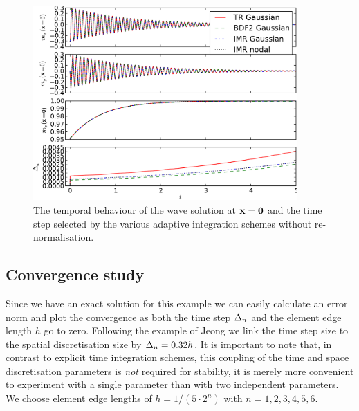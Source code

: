 \begin{figure}
  \centering
  \includegraphics[width=0.9\textwidth]{plots/2d_wave_solution_time_trace/get2oftracevaluesvs-get3oftracevaluesvs-get4oftracevaluesvs-dtsvstimes.pdf}
  \caption{The temporal behaviour of the wave solution at $\boldsymbol{\mathrm{x}} = \mathbf{0}$ and the time step selected by the various adaptive integration schemes without re-normalisation.
    }
  \label{fig:2d-wave-time-trace}
\end{figure}


\subsection{Convergence study}

Since we have an exact solution for this example we can easily calculate an error norm and plot the convergence as both the time step $\Delta_{n}$ and the element edge length $h$ go to zero.
Following the example of Jeong \etal \cite{Jeong2014} we link the time step size to the spatial discretisation size by $\Delta_{n} = 0.32h$.
It is important to note that, in contrast to explicit time integration schemes, this coupling of the time and space discretisation parameters is \emph{not} required for stability, it is merely more convenient to experiment with a single parameter than with two independent parameters.
We choose element edge lengths of $h = 1/(5 \cdot 2^n)$ with $n=1,2,3,4,5,6$.

